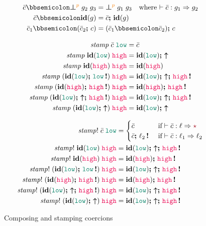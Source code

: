 \begin{figure}[tbp]
\raggedright
  {\small
\begin{align*}
\bar{c} \mdoubleplus \err{g_2}{g_3}{p} &= \err{g_1}{g_3}{p}  \quad\text{where $\vdash \bar{c} : g_1 \Rightarrow g_2$} \\
\bar{c} \mdoubleplus \id{g} &= \bar{c} \seq \id{g} \\
\bar{c}_1 \mdoubleplus (\bar{c}_2 \seq c) &= (\bar{c}_1 \mdoubleplus \bar{c}_2) \seq c
\end{align*}
  }

  \hfill
  {\small
\begin{align*}
\mathit{stamp} \; \bar{c} \; \low &= \bar{c} \\
\mathit{stamp} \; \id{\low} \; \high &= \id{\low}\seq\up \\
\mathit{stamp} \; \id{\high} \; \high &= \id{\high} \\
\mathit{stamp} \; (\id{\low}\seq\inj{\low}) \; \high &= \id{\low}\seq\up\seq\inj{\high} \\
\mathit{stamp} \; (\id{\high}\seq\inj{\high}) \; \high &= \id{\high}\seq\inj{\high} \\
\mathit{stamp} \; (\id{\low}\seq\up\seq\inj{\high}) \; \high &= \id{\low}\seq\up\seq\inj{\high} \\
\mathit{stamp} \; (\id{\low}\seq\up) \; \high &= \id{\low}\seq\up
\end{align*}
}

  {\small
\begin{align*}
\mathit{stamp!} \; \bar{c} \; \low &=
  \begin{cases}
  \bar{c} & \text{~if} \vdash \bar{c} : \ell \Rightarrow \unk \\
  \bar{c}\seq\inj{\ell_2} & \text{~if} \vdash \bar{c} : \ell_1 \Rightarrow \ell_2
  \end{cases}
  \\
\mathit{stamp!} \; \id{\low} \; \high &= \id{\low}\seq\up\seq\inj{\high} \\
\mathit{stamp!} \; \id{\high} \; \high &= \id{\high}\seq\inj{\high} \\
\mathit{stamp!} \; (\id{\low}\seq\inj{\low}) \; \high &= \id{\low}\seq\up\seq\inj{\high} \\
\mathit{stamp!} \; (\id{\high}\seq\inj{\high}) \; \high &= \id{\high}\seq\inj{\high} \\
\mathit{stamp!} \; (\id{\low}\seq\up\seq\inj{\high}) \; \high &= \id{\low}\seq\up\seq\inj{\high} \\
\mathit{stamp!} \; (\id{\low}\seq\up) \; \high &= \id{\low}\seq\up\seq\inj{\high}
\end{align*}
}
  \caption{Composing and stamping coercions}
  \label{fig:comp-stampc}
\end{figure}

